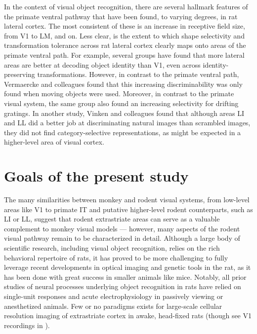 In the context of visual object recognition, there are several hallmark features of the primate ventral pathway that have been found, to varying degrees, in rat lateral cortex. The most consistent of these is an increase in receptive field size, from V1 to LM, and on\cite{Vermaercke2014, Tafazoli2017}. Less clear, is the extent to which shape selectivity and transformation tolerance across rat lateral cortex clearly maps onto areas of the primate ventral path. For example, several groups have found that more lateral areas are better at decoding object identity than V1, even across identity-preserving transformations\cite{Tafazoli2017, Vermaercke2014, Froudarakis2020}. However, in contrast to the primate ventral path, Vermaercke and colleagues found that this increasing discriminability was only found when moving objects were used\cite{Vermaercke2014}. Moreover, in contrast to the primate visual system, the same group also found an increasing selectivity for drifting gratings. In another study, Vinken and colleagues found that although areas LI and LL did a better job at discriminating natural images than scrambled images, they did not find category-selective representations, as might be expected in a  higher-level area of visual cortex\cite{Vinken2016}. 


\section{Goals of the present study}
The many similarities between monkey and rodent visual systems, from low-level areas like V1 to primate IT and putative higher-level rodent counterparts, such as LI or LL, suggest that rodent extrastriate areas can serve as a valuable complement to monkey visual models --- however, many aspects of the rodent visual pathway remain to be characterized in detail. Although a large body of scientific research, including visual object recognition, relies on the rich behavioral repertoire of rats, it has proved to be more challenging to fully leverage recent developments in optical imaging and genetic tools in the rat, as it has been done with great success in smaller animals like mice\cite{Luo2018}. Notably, all prior studies of neural processes underlying object recognition in rats have relied on single-unit responses and acute electrophysiology in passively viewing or anesthetized animals. Few or no paradigms exists for large-scale cellular resolution imaging of extrastriate cortex in awake, head-fixed rats (though see V1 recordings in \cite{Greenberg2008}). 

